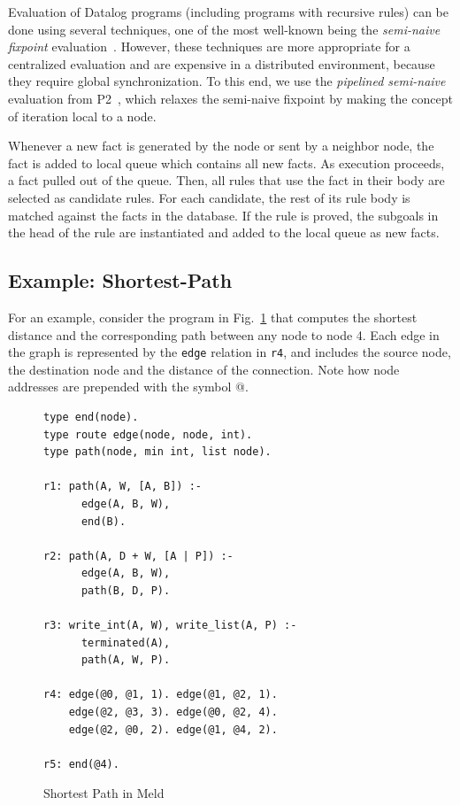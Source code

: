 \documentclass[preprint]{sigplanconf}
\begin{document}
Evaluation of Datalog programs (including programs with recursive rules) can be done using
several techniques, one of the most well-known being the \emph{semi-naive fixpoint}
evaluation~\cite{Balbin1987259, Bancilhon:1986:NER:8789.8804}. However, these techniques
are more appropriate for a centralized evaluation and are expensive in a distributed environment,
because they require global synchronization. To this end, we use the \emph{pipelined semi-naive}
evaluation from P2~\cite{Loo-condie-garofalakis-p2}, which relaxes the semi-naive fixpoint
by making the concept of iteration local to a node.

Whenever a new fact is generated by the node or sent by a neighbor node, the fact is added to local
queue which contains all new facts. As execution proceeds, a fact pulled out of the queue. Then,
all rules that use the fact in their body are selected as candidate rules. For each candidate, the
rest of its rule body is matched against the facts in the database. If the rule is proved, the subgoals
in the head of the rule are instantiated and added to the local queue as new facts.

\subsection{Example: Shortest-Path}

For an example, consider the program in Fig.~\ref{fig:shortestpath} that computes the
shortest distance and the corresponding path between any node to node 4.
Each edge in the graph is represented
by the \texttt{edge} relation in \texttt{r4}, and includes the source node, the destination node and
the distance of the connection. Note how node addresses are prepended with the symbol @.

\begin{figure}
\begin{verbatim}
type end(node).
type route edge(node, node, int).
type path(node, min int, list node).

r1: path(A, W, [A, B]) :-
      edge(A, B, W),
      end(B).

r2: path(A, D + W, [A | P]) :-
      edge(A, B, W),
      path(B, D, P).
  
r3: write_int(A, W), write_list(A, P) :-
      terminated(A),
      path(A, W, P).
  
r4: edge(@0, @1, 1). edge(@1, @2, 1).
    edge(@2, @3, 3). edge(@0, @2, 4).
    edge(@2, @0, 2). edge(@1, @4, 2).

r5: end(@4).
\end{verbatim}
\caption{Shortest Path in Meld}
\label{fig:shortestpath}
\end{figure}
\end{document}
